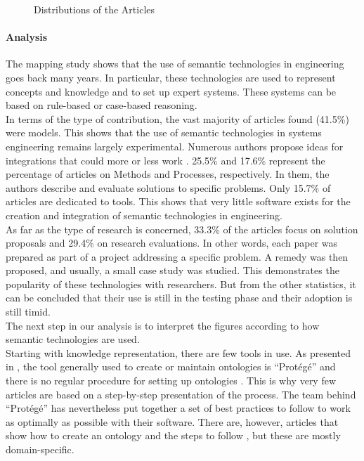 \begin{figure}[h]
\begin{subfigure}[b]{0.45\textwidth}
                \end{subfigure}
                \caption{\label{fig:distro-art} Distributions of the Articles}
            \end{figure}
            
            \paragraph{Analysis\label{para:sms_analysis}}
            The mapping study shows that the use of semantic technologies in engineering goes back many years. In particular, these technologies are used to represent concepts and knowledge and to set up expert systems. These systems can be based on rule-based or case-based reasoning.\\
            
            In terms of the type of contribution, the vast majority of articles found (41.5\%) were models. This shows that the use of semantic technologies in systems engineering remains largely experimental. Numerous authors propose ideas for integrations that could more or less work \cite{benjamin2007using, tofani2010using, benjamin2006using, bouza2008semtree}. 25.5\% and 17.6\% represent the percentage of articles on Methods and Processes, respectively. In them, the authors describe and evaluate solutions to specific problems. Only 15.7\% of articles are dedicated to tools. This shows that very little software exists for the creation and integration of semantic technologies in engineering.\\
            As far as the type of research is concerned, 33.3\% of the articles focus on solution proposals and 29.4\% on research evaluations. In other words, each paper was prepared as part of a project addressing a specific problem. A remedy was then proposed, and usually, a small case study was studied. This demonstrates the popularity of these technologies with researchers. But from the other statistics, it can be concluded that their use is still in the testing phase and their adoption is still timid.\\

            The next step in our analysis is to interpret the figures according to how semantic technologies are used.\\
            Starting with knowledge representation, there are few tools in use. As presented in \cite{chen2012recommendation, abadi2018improving, liu2010ontology}, the tool generally used to create or maintain ontologies is “Protégé” and there is no regular procedure for setting up ontologies \cite{noy2001ontology}. This is why very few articles are based on a step-by-step presentation of the process. The team behind “Protégé” has nevertheless put together a set of best practices to follow \cite{noy2001ontology} to work as optimally as possible with their software. There are, however, articles that show how to create an ontology and the steps to follow \cite{sure2002methodology, li2018ontology}, but these are mostly domain-specific. \\

